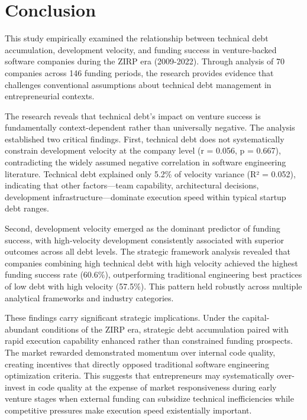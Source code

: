 \chapter{Conclusion}\label{sec:conclusion}

This study empirically examined the relationship between technical debt accumulation, development velocity, and funding success in venture-backed software companies during the \ac{ZIRP} era (2009-2022). Through analysis of 70 companies across 146 funding periods, the research provides evidence that challenges conventional assumptions about technical debt management in entrepreneurial contexts.

The research reveals that technical debt's impact on venture success is fundamentally context-dependent rather than universally negative. The analysis established two critical findings. First, technical debt does not systematically constrain development velocity at the company level (r = 0.056, p = 0.667), contradicting the widely assumed negative correlation in software engineering literature. Technical debt explained only 5.2\% of velocity variance (R² = 0.052), indicating that other factors—team capability, architectural decisions, development infrastructure—dominate execution speed within typical startup debt ranges.

Second, development velocity emerged as the dominant predictor of funding success, with high-velocity development consistently associated with superior outcomes across all debt levels. The strategic framework analysis revealed that companies combining high technical debt with high velocity achieved the highest funding success rate (60.6\%), outperforming traditional engineering best practices of low debt with high velocity (57.5\%). This pattern held robustly across multiple analytical frameworks and industry categories.

These findings carry significant strategic implications. Under the capital-abundant conditions of the \ac{ZIRP} era, strategic debt accumulation paired with rapid execution capability enhanced rather than constrained funding prospects. The market rewarded demonstrated momentum over internal code quality, creating incentives that directly opposed traditional software engineering optimization criteria. This suggests that entrepreneurs may systematically over-invest in code quality at the expense of market responsiveness during early venture stages when external funding can subsidize technical inefficiencies while competitive pressures make execution speed existentially important.


